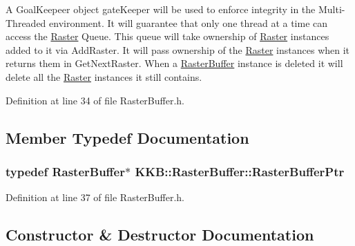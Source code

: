 A \textquotesingle{}Goal\+Keepeer\textquotesingle{} object \textquotesingle{}gate\+Keeper\textquotesingle{} will be used to enforce integrity in the Multi-\/\+Threaded environment. It will guarantee that only one thread at a time can access the \hyperlink{class_k_k_b_1_1_raster}{Raster} Queue. This queue will take ownership of \textquotesingle{}\hyperlink{class_k_k_b_1_1_raster}{Raster}\textquotesingle{} instances added to it via \textquotesingle{}Add\+Raster\textquotesingle{}. It will pass ownership of the \textquotesingle{}\hyperlink{class_k_k_b_1_1_raster}{Raster}\textquotesingle{} instances when it returns them in Get\+Next\+Raster. When a \textquotesingle{}\hyperlink{class_k_k_b_1_1_raster_buffer}{Raster\+Buffer}\textquotesingle{} instance is deleted it will delete all the \textquotesingle{}\hyperlink{class_k_k_b_1_1_raster}{Raster}\textquotesingle{} instances it still contains. 

Definition at line 34 of file Raster\+Buffer.\+h.



\subsection{Member Typedef Documentation}
\subsubsection[{\texorpdfstring{Raster\+Buffer\+Ptr}{RasterBufferPtr}}]{\setlength{\rightskip}{0pt plus 5cm}typedef {\bf Raster\+Buffer}$\ast$ {\bf K\+K\+B\+::\+Raster\+Buffer\+::\+Raster\+Buffer\+Ptr}}\hypertarget{class_k_k_b_1_1_raster_buffer_a1dc33d464c891b33bf9cf582d072d070}{}\label{class_k_k_b_1_1_raster_buffer_a1dc33d464c891b33bf9cf582d072d070}


Definition at line 37 of file Raster\+Buffer.\+h.



\subsection{Constructor \& Destructor Documentation}
